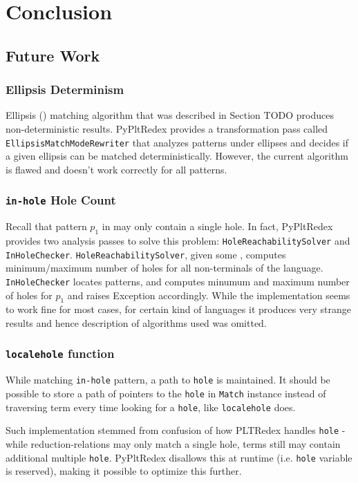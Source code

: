 \chapter{Conclusion} 

\section{Future Work}
\subsection{Ellipsis Determinism}
Ellipsis (\RepeatNoArg) matching algorithm that was described in Section TODO produces non-deterministic results. PyPltRedex provides a transformation pass called \texttt{EllipsisMatchModeRewriter} that analyzes patterns under ellipses and decides if a given ellipsis can be matched deterministically. However, the current algorithm is flawed and doesn't work correctly for all patterns.

\subsection{\texttt{in-hole} Hole Count}
Recall that pattern $p_1$ in \PatternInHole may only contain a single hole. In fact, PyPltRedex provides two analysis passes to solve this problem: \texttt{HoleReachabilitySolver} and \texttt{InHoleChecker}. \texttt{HoleReachabilitySolver}, given some \DefineLanguageNoArg, computes minimum/maximum number of holes for all non-terminals of the language. \texttt{InHoleChecker} locates \PatternInHoleNoArg patterns, and computes minumum and maximum number of holes for $p_1$ and raises Exception accordingly. While the implementation seems to work fine for most cases, for certain kind of languages it produces very strange results and hence description of algorithms used was omitted.

\subsection{\texttt{localehole} function}
While matching \texttt{in-hole} pattern, a path to \texttt{hole} is maintained. It should be possible to store a path of pointers to the \texttt{hole} in \texttt{Match} instance instead of traversing term every time looking for a \texttt{hole}, like \texttt{localehole} does.

Such implementation stemmed from confusion of how PLTRedex handles \texttt{hole} - while reduction-relations may only match a single hole, terms still may contain additional multiple \texttt{hole}. PyPltRedex disallows this at runtime (i.e. \texttt{hole} variable is reserved), making it possible to optimize this further.

